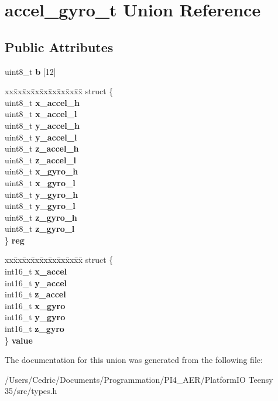 \hypertarget{unionaccel__gyro__t}{}\section{accel\+\_\+gyro\+\_\+t Union Reference}
\label{unionaccel__gyro__t}
\subsection*{Public Attributes}
\begin{DoxyCompactItemize}
\item 
\mbox{\label{unionaccel__gyro__t_a7f9190f2f4ba0ab5fd83b56e6c8d3976}} 
uint8\+\_\+t {\bfseries b} \mbox{[}12\mbox{]}
\item 
\mbox{\label{unionaccel__gyro__t_aabc564c4533ad428e3fd15e3e645d191}} 
\begin{tabbing}
xx\=xx\=xx\=xx\=xx\=xx\=xx\=xx\=xx\=\kill
struct \{\\
\>uint8\_t {\bfseries x\_accel\_h}\\
\>uint8\_t {\bfseries x\_accel\_l}\\
\>uint8\_t {\bfseries y\_accel\_h}\\
\>uint8\_t {\bfseries y\_accel\_l}\\
\>uint8\_t {\bfseries z\_accel\_h}\\
\>uint8\_t {\bfseries z\_accel\_l}\\
\>uint8\_t {\bfseries x\_gyro\_h}\\
\>uint8\_t {\bfseries x\_gyro\_l}\\
\>uint8\_t {\bfseries y\_gyro\_h}\\
\>uint8\_t {\bfseries y\_gyro\_l}\\
\>uint8\_t {\bfseries z\_gyro\_h}\\
\>uint8\_t {\bfseries z\_gyro\_l}\\
\} {\bfseries reg}\\

\end{tabbing}\item 
\mbox{\label{unionaccel__gyro__t_ad2684d913217cd85338f71871e8c1deb}} 
\begin{tabbing}
xx\=xx\=xx\=xx\=xx\=xx\=xx\=xx\=xx\=\kill
struct \{\\
\>int16\_t {\bfseries x\_accel}\\
\>int16\_t {\bfseries y\_accel}\\
\>int16\_t {\bfseries z\_accel}\\
\>int16\_t {\bfseries x\_gyro}\\
\>int16\_t {\bfseries y\_gyro}\\
\>int16\_t {\bfseries z\_gyro}\\
\} {\bfseries value}\\

\end{tabbing}\end{DoxyCompactItemize}


The documentation for this union was generated from the following file\+:\begin{DoxyCompactItemize}
\item 
/\+Users/\+Cedric/\+Documents/\+Programmation/\+P\+I4\+\_\+\+A\+E\+R/\+Platform\+I\+O Teensy 35/src/types.\+h\end{DoxyCompactItemize}
